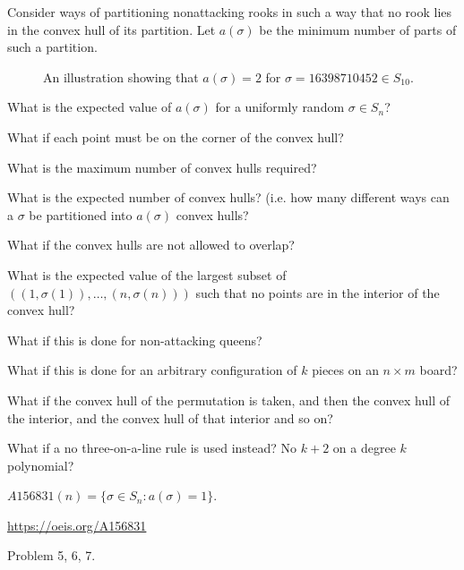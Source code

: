\documentclass{article}
\begin{document}
Consider ways of partitioning nonattacking rooks in such a way that no rook lies
in the convex hull of its partition. Let $a(\sigma)$ be the minimum number of parts
of such a partition.
\begin{figure}[ht!]
  \centering
  \caption{
    An illustration showing that $a(\sigma) = 2$ for $\sigma = 16398710452 \in S_{10}$.
  }
\end{figure}

\begin{question}
  What is the expected value of $a(\sigma)$ for a uniformly random $\sigma \in S_n$?
\end{question}

\begin{related}
  \item What if each point must be on the corner of the convex hull?
  \item What is the maximum number of convex hulls required?
  \item What is the expected number of convex hulls?
  (i.e. how many different ways can a $\sigma$ be partitioned into
  $a(\sigma)$ convex hulls?
  \item What if the convex hulls are not allowed to overlap?
  \item What is the expected value of the largest subset of
    $((1, \sigma(1)), \hdots, (n, \sigma(n)))$ such that no points are in the
    interior of the convex hull?
  \item What if this is done for non-attacking queens?
  \item What if this is done for an arbitrary configuration of $k$ pieces on an
    $n \times m$ board?
  \item What if the convex hull of the permutation is taken, and then the convex
  hull of the interior, and the convex hull of that interior and so on?
  \item What if a no three-on-a-line rule is used instead?
  No $k+2$ on a degree $k$ polynomial?
\end{related}

\begin{note}
  \item $A156831(n) = \{ \sigma \in S_n : a(\sigma) = 1 \}$.
\end{note}

\begin{references}
  \item \url{https://oeis.org/A156831}
  \item Problem 5, 6, 7.
\end{references}
\end{document}
